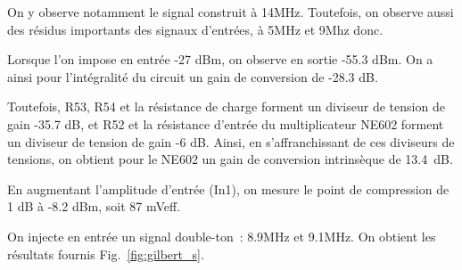 \documentclass{article}
\begin{document}
On y observe notamment le signal construit à 14MHz. Toutefois, on observe aussi des résidus importants des signaux d'entrées, à 5MHz et 9Mhz donc.



Lorsque l'on impose en entrée -27 dBm, on observe en sortie -55.3 dBm. On a ainsi pour l'intégralité du circuit un gain de conversion de -28.3 dB.

Toutefois, R53, R54 et la résistance de charge forment un diviseur de tension de gain -35.7 dB, et R52 et la résistance d'entrée du multiplicateur NE602 forment un diviseur de tension de gain -6 dB. Ainsi, en s'affranchissant de ces diviseurs de tensions, on obtient pour le NE602 un gain de conversion intrinsèque de 13.4~dB.




En augmentant l'amplitude d'entrée (In1), on mesure le point de compression de 1 dB à -8.2 dBm, soit 87 mVeff.





On injecte en entrée un signal double-ton~: 8.9MHz et 9.1MHz. On obtient les résultats fournis Fig.~\ref{fig:gilbert_s}.
\end{document}
